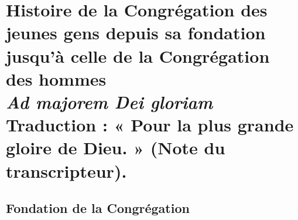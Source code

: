 \part*{Histoire de la Congrégation des jeunes gens depuis sa fondation jusqu'à celle de la Congrégation des hommes\\[1em]{\normalfont\large\textit{Ad majorem Dei gloriam}}\\[0.5em]{\normalfont\small Traduction : « Pour la plus grande gloire de Dieu. » (Note du transcripteur).}}
\setcounter{chapter}{0}
\renewcommand{\theHchapter}{histoire.\arabic{chapter}}
\chapter{Fondation de la Congrégation}

